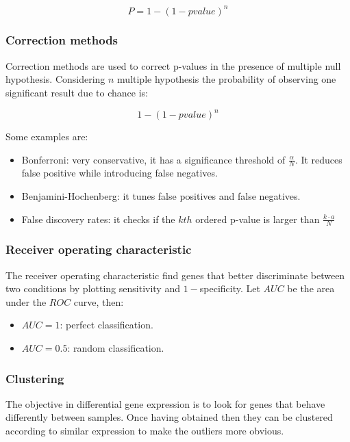 			$$P = 1-(1-pvalue)^n$$

		\subsubsection{Correction methods}
		Correction methods are used to correct p-values in the presence of multiple null hypothesis.
		Considering $n$ multiple hypothesis the probability of observing one significant result due to chance is:

		$$1-(1-pvalue)^n$$

		Some examples are:

		\begin{multicols}{2}
			\begin{itemize}
				\item Bonferroni: very conservative, it has a significance threshold of $\frac{\alpha}{N}$.
					It reduces false positive while introducing false negatives.
				\item Benjamini-Hochenberg: it tunes false positives and false negatives.
				\item False discovery rates: it checks if the $kth$ ordered p-value is larger than $\frac{k\cdot a}{N}$
			\end{itemize}
		\end{multicols}

		\subsubsection{Receiver operating characteristic}
		The receiver operating characteristic find genes that better discriminate between two conditions by plotting sensitivity and $1-$specificity.
		Let $AUC$ be the area under the $ROC$ curve, then:

		\begin{multicols}{2}
			\begin{itemize}
				\item $AUC=1$: perfect classification.
				\item $AUC = 0.5$: random classification.
			\end{itemize}
		\end{multicols}

		\subsubsection{Clustering}
		The objective in differential gene expression is to look for genes that behave differently between samples.
		Once having obtained then they can be clustered according to similar expression to make the outliers more obvious.

